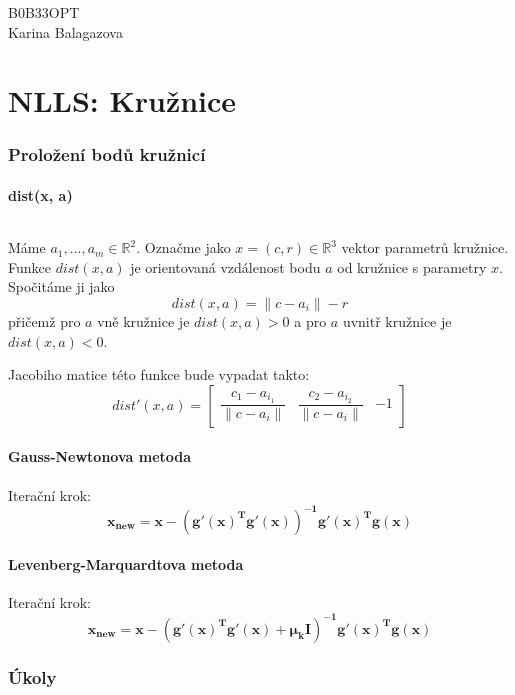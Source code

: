 \documentclass[11pt]{article}
\begin{document}
\begin{flushright}
B0B33OPT\\
Karina Balagazova
\end{flushright}
\part*{NLLS: Kružnice}

\section{Proložení bodů kružnicí}


\subsection{dist(x, a)}
\paragraph{}
Máme $a_{1},...,a_{m} \in \mathbb{R}^{2}$. Označme jako $x = (c, r) \in \mathbb{R}^{3}$ vektor parametrů kružnice. Funkce $dist(x, a)$ je orientovaná vzdálenost bodu $a$ od kružnice s parametry $x$. Spočitáme ji jako
$$ dist(x, a) = \|c-a_{i}\| - r$$
přičemž pro $a$ vně kružnice je $ dist(x, a) > 0 $ a pro $a$ uvnitř kružnice je $ dist(x, a) < 0$.

Jacobiho matice této funkce bude vypadat takto: 
$$ dist'(x, a) = 
\begin{bmatrix}
\dfrac{c_{1} - a_{i_{1}}}{\|c-a_{i}\|} & \dfrac{c_{2} - a_{i_{2}}}{\|c-a_{i}\|} & -1
\end{bmatrix}$$


\subsection{Gauss-Newtonova metoda}
Iterační krok: 
$$\mathbf{x_{new} = x - (g'(x)^{T} g'(x))^{-1} g'(x)^{T}g(x)}$$

\subsection{Levenberg-Marquardtova metoda}
Iterační krok: 
$$\mathbf{x_{new} = x - (g'(x)^{T} g'(x) + \mu_{k}I)^{-1} g'(x)^{T}g(x)}$$




\section*{Úkoly}
\end{document}
